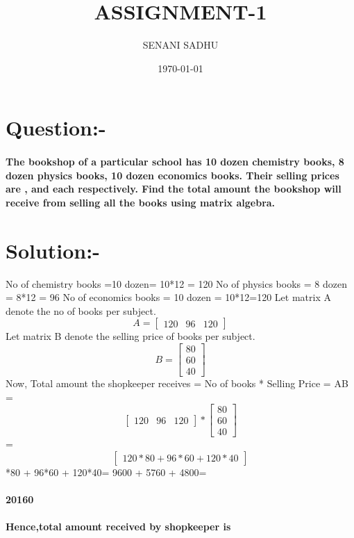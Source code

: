 \documentclass[a4paper,12pt]{article}
\title{ASSIGNMENT-1}
\author{SENANI SADHU}
\date{\today}
\begin{document}
	\maketitle
	\section{Question:-}
	\paragraph{The bookshop of a particular school has
		10 dozen chemistry books, 8 dozen physics
		books, 10 dozen economics books. Their
		selling prices are ,  and  each
		respectively. Find the total amount the
		bookshop will receive from selling all the
		books using matrix algebra.}
	\section{Solution:-}
	No of chemistry books =10 dozen= 10*12 = 120
	\newline
	No of physics books = 8 dozen = 8*12 = 96
	\newline
	No of economics books = 10 dozen = 10*12=120
	\newline
	Let matrix A denote the no of books per subject.
	\newline
	\begin{equation}
		A=\begin{bmatrix}
			120 &96 & 120
		  \end{bmatrix}
	\end{equation}
	\newline
	Let matrix B  denote  the selling price of  books  per subject.
	\newline
	\begin{equation}
		B=\begin{bmatrix}
			80\\
			60\\
			40
		\end{bmatrix}
	\end{equation}
	 \newline
	 Now,
	 \newline
	 Total amount the shopkeeper receives =
	 No of books * Selling Price = AB
	 =\begin{equation}
	 	\begin{bmatrix}
	 		120 & 96 &120
	 	\end{bmatrix}*\begin{bmatrix}
	 	80\\
	 	60\\
	 	40
 	\end{bmatrix}
	 \end{equation}
 \newline
 =\begin{equation}
 	\begin{bmatrix}
 		120*80 + 96*60 + 120*40
 	\end{bmatrix}
 \end{equation}
*80 + 96*60 + 120*40= 9600 + 5760 + 4800=\paragraph{20160}

\paragraph{Hence,total amount received by shopkeeper is }
\end{document}
